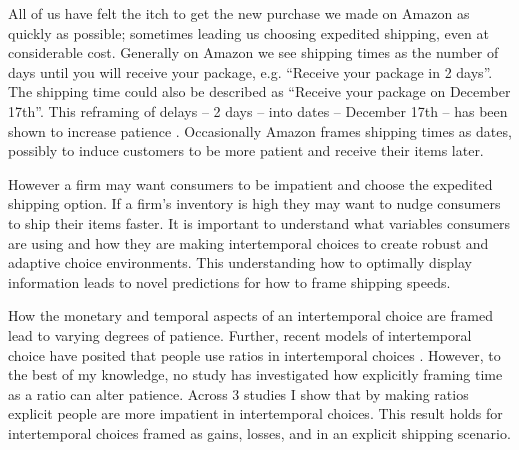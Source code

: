 \documentclass[]{article}
\begin{document}
All of us have felt the itch to get the new purchase we made on Amazon as quickly as possible; sometimes leading us choosing expedited shipping, even at considerable cost. 
Generally on Amazon we see shipping times as the number of days until you will receive your package, e.g.  ``Receive your package in 2 days''. 
The shipping time could also be described as ``Receive your package on December 17th''. 
This reframing of delays -- 2 days -- into dates -- December 17th -- has been shown to increase patience \cite{Read2005}.
Occasionally Amazon frames shipping times as dates, possibly to induce customers to be more patient and receive their items later. 

However a firm may want consumers to be impatient and choose the expedited shipping option. 
If a firm's inventory is high they may want to nudge consumers to ship their items faster. 
It is important to understand what variables consumers are using and how they are making intertemporal choices to create robust and adaptive choice environments. 
This understanding how to optimally display information leads to novel predictions for how to frame shipping speeds. 

How the monetary and temporal aspects of an intertemporal choice are framed lead to varying degrees of patience.
Further, recent models of intertemporal choice have posited that people use ratios in intertemporal choices \cite{Read2013, MarzilliEricson2015}. 
However, to the best of my knowledge, no study has investigated how explicitly framing time as a ratio can alter patience.
Across 3 studies I show that by making ratios explicit people are more impatient in intertemporal choices. 
This result holds for intertemporal choices framed as gains, losses, and in an explicit shipping scenario. 



%
\end{document}
